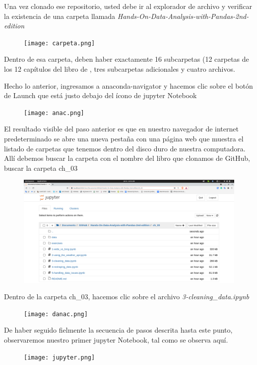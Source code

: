 \documentclass[aspectratio=169]{beamer}
\begin{document}
\begin{frame}
Una vez clonado ese repositorio, usted debe ir al explorador de archivo y verificar la existencia de una carpeta llamada \textit{Hands-On-Data-Analysis-with-Pandas-2nd-edition}
\begin{figure}
\centering
\texttt{[image: carpeta.png]}
\end{figure}
Dentro de esa carpeta, deben haber exactamente 16 subcarpetas (12 carpetas de los 12 capítulos del libro de \citeauthor{Molin2021} \citeyear{Molin2021}, tres subcarpetas adicionales y cuatro archivos.
\end{frame}

\begin{frame}
Hecho lo anterior, ingresamos a anaconda-navigator y hacemos clic sobre el botón de Launch que está justo debajo del ícono de jupyter Notebook
\begin{figure}
\centering
\texttt{[image: anac.png]}
\end{figure}
\end{frame}

\begin{frame}
El resultado visible del paso anterior es que en nuestro navegador de internet predeterminado se abre una nueva pestaña con una página web que muestra el listado de carpetas que tenemos dentro del disco duro de nuestra computadora. Allí debemos buscar la carpeta con el nombre del libro que clonamos de GitHub, buscar la carpeta ch\_03
\begin{figure}
\centering
\includegraphics[width=.65\textwidth]{ch_03.png}
\end{figure}
\end{frame}

\begin{frame}
Dentro de la carpeta ch\_03, hacemos clic sobre el archivo \textit{3-cleaning\_data.ipynb}
\begin{figure}
\centering
\texttt{[image: danac.png]}
\end{figure}
\end{frame}

\begin{frame}
De haber seguido fielmente la secuencia de pasos descrita hasta este punto, observaremos nuestro primer jupyter Notebook, tal como se observa aquí.
\begin{figure}
\centering
\texttt{[image: jupyter.png]}
\end{figure}
\end{frame}
\end{document}
